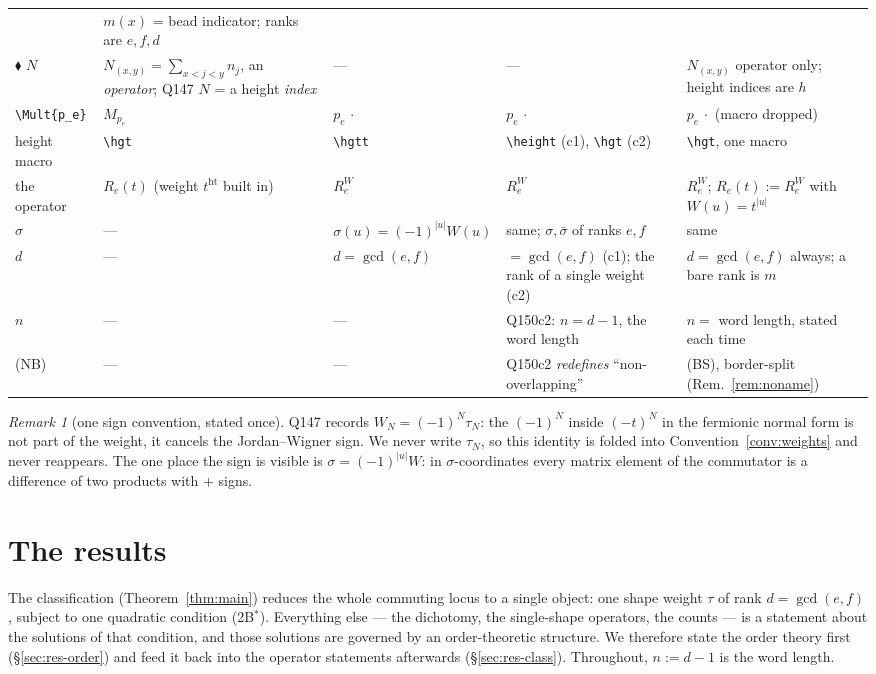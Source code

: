 \documentclass[11pt]{article}
\theoremstyle{definition}
\theoremstyle{remark}
\newtheorem{remark}[theorem]{Remark}
\newcommand{\hgt}{\operatorname{ht}}     %
\begin{document}
\begin{longtable}{@{}p{}p{}p{}p{}p{}@{}}
  & $m(x)$ = bead indicator; ranks are $e,f,d$\\
$\blacklozenge$ $N$ & $N_{(x,y)}=\sum_{x<j<y}n_j$, an \emph{operator}; Q147 $N$ = a height
  \emph{index} & --- & --- & $N_{(x,y)}$ operator only; height indices are $h$\\
\verb|\Mult{p_e}| & $M_{p_e}$ & $p_e\,\cdot$ & $p_e\,\cdot$ & $p_e\,\cdot$ (macro dropped)\\
height macro & \verb|\hgt| & \verb|\hgtt| & \verb|\height| (c1), \verb|\hgt| (c2)
  & \verb|\hgt|, one macro\\
the operator & $R_e(t)$ (weight $t^{\hgt}$ built in) & $R_e^{W}$ & $R_e^{W}$ & $R_e^{W}$;
  $R_e(t):=R_e^{W}$ with $W(u)=t^{|u|}$\\
$\sigma$ & --- & $\sigma(u)=(-1)^{|u|}W(u)$ & same; $\sigma,\bar\sigma$ of ranks $e,f$
  & same\\
$d$ & --- & $d=\gcd(e,f)$ & $=\gcd(e,f)$ (c1); the rank of a single weight (c2)
  & $d=\gcd(e,f)$ always; a bare rank is $m$\\
$n$ & --- & --- & Q150c2: $n=d-1$, the word length & $n=$ word length, stated each time\\
(NB) & --- & --- & Q150c2 \emph{redefines} ``non-overlapping'' & (BS), border-split
  (Rem.~\ref{rem:noname})\\
\hline
\end{longtable}

\begin{remark}[one sign convention, stated once]\label{rem:signs}
Q147 records $W_N=(-1)^{N}\tau_N$: the $(-1)^{N}$ inside $(-t)^{N}$ in the fermionic normal
form is not part of the weight, it cancels the Jordan--Wigner sign.  We never write $\tau_N$,
so this identity is folded into Convention~\ref{conv:weights} and never reappears.  The one
place the sign is visible is $\sigma=(-1)^{|u|}W$: in $\sigma$-coordinates every matrix element
of the commutator is a difference of two products with $+$ signs.
\end{remark}

\section{The results}\label{sec:results}

The classification (Theorem~\ref{thm:main}) reduces the whole commuting locus to a single
object: one shape weight $\tau$ of rank $d=\gcd(e,f)$, subject to one quadratic condition
(2B$^{*}$).  Everything else --- the dichotomy, the single-shape operators, the counts --- is
a statement about the solutions of that condition, and those solutions are governed by an
order-theoretic structure.  We therefore state the order theory first
(\S\ref{sec:res-order}) and feed it back into the operator statements afterwards
(\S\ref{sec:res-class}).  Throughout, $n:=d-1$ is the word length.
\end{document}

